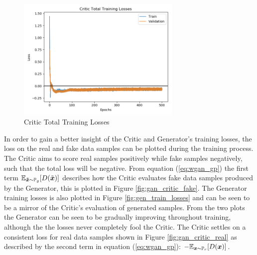\begin{figure}[h!]
    \centering
        \includegraphics[width=0.7\textwidth]{figures/gan/critic_total_train_losses.png}
    \caption{Critic Total Training Losses}\label{fig:gan_total_critic_losses}
\end{figure} 

In order to gain a better insight of the Critic and Generator's training losses, the loss on the real and fake data samples can be plotted during the training process.
The Critic aims to score real samples positively while fake samples negatively, such that the total loss will be negative.
From equation (\ref{eq:wgan_gp}) the first term $\mathbb{E}_{{\boldsymbol{{\tilde{x}}}} \sim \mathbb{P}_{g}} [D(\tilde{{{\boldsymbol{{x}}}}})]$ describes how the Critic evaluates fake data samples produced by the Generator, this is plotted in Figure \ref{fig:gan_critic_fake}.
The Generator training losses is also plotted in Figure \ref{fig:gen_train_losses} and can be seen to be a mirror of the Critic's evaluation of generated samples.
From the two plots the Generator can be seen to be gradually improving throughout training, although the the losses never completely fool the Critic.
The Critic settles on a consistent loss for real data samples shown in Figure \ref{fig:gan_critic_real} as described by the second term in equation (\ref{eq:wgan_gp}): $- \mathbb{E}_{{\boldsymbol{{x}}} \sim \mathbb{P}_{r}} [D({\boldsymbol{{x}}})]$.


